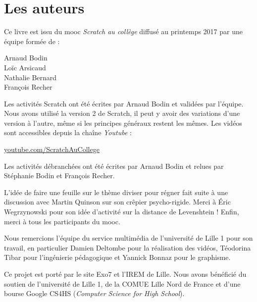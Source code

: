 
\clearemptydoublepage
\pagestyle{empty}\thispagestyle{empty}

\vspace*{\fill}

\section*{Les auteurs}


Ce livre est issu du mooc \emph{Scratch au collège} diffusé au printemps 2017 par une équipe formée de :
\begin{center}
Arnaud Bodin\\
Loïc Arsicaud\\
Nathalie Bernard\\
François Recher
\end{center}

\bigskip 


Les activités Scratch ont été écrites par Arnaud Bodin et validées par l'équipe. 
Nous avons utilisé la version 2 de Scratch, il peut y avoir des variations 
d'une version à l'autre, même si les principes généraux restent les mêmes. 
Les vidéos sont accessibles depuis la chaîne \emph{Youtube} :\\
\centerline{
\href{https://www.youtube.com/c/ScratchAuCollege}{youtube.com/ScratchAuCollege}}


\bigskip 

Les activités débranchées ont été écrites par Arnaud Bodin et relues par Stéphanie Bodin et François Recher.

\bigskip 

L'idée de faire une feuille sur le thème \og{}diviser pour régner\fg{} fait suite à une discussion avec Martin Quinson sur son \og{}crêpier psycho-rigide\fg{}.
Merci à Éric Wegrzynowski pour son idée d'activité sur la distance de Levenshtein ! Enfin, merci à tous les participants du mooc. 

\bigskip 

Nous remercions l'équipe du service multimédia de l'université de Lille 1 pour son travail, en particulier Damien Deltombe pour la réalisation des vidéos, Téodorina Tibar pour l'ingénierie pédagogique et Yannick Bonnaz pour le graphisme.


\bigskip 

Ce projet est porté par le site Exo7 et l'IREM de Lille. 
Nous avons bénéficié du soutien de l'université de Lille 1, de la COMUE Lille Nord de France et d'une bourse Google CS4HS (\emph{Computer Science for High School}).

